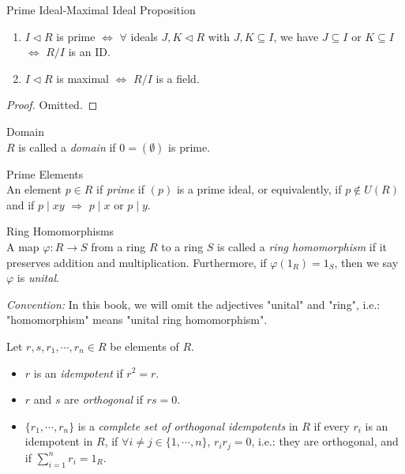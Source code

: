 \begin{proposition}{Prime Ideal-Maximal Ideal Proposition}
\begin{enumerate}
    \item $I \triangleleft R$ is prime $\Leftrightarrow$ $\forall$ ideals $J,K \triangleleft R$ with $J,K \subseteq I$, we have $J \subseteq I$ or $K \subseteq I$ $\Leftrightarrow$ $R/I$ is an ID.
    \item $I \triangleleft R$ is maximal $\Leftrightarrow$ $R/I$ is a field.
\end{enumerate}
\end{proposition}

\begin{proof}
    Omitted.
\end{proof}

\begin{definition}{Domain}\\
$R$ is called a \textit{domain} if $0= (\emptyset)$ is prime.
\end{definition}

\begin{definition}{Prime Elements}\\
An element $p \in R$ if \textit{prime} if $(p)$ is a prime ideal, or equivalently, if $p \notin U(R)$ and if $p \mid xy$ $\Rightarrow$ $p\mid x$ or $p\mid y$.
\end{definition}

\begin{definition}{Ring Homomorphisms}\\
A map $\varphi: R \to S$ from a ring $R$ to a ring $S$ is called a \textit{ring homomorphism} if it preserves addition and multiplication. Furthermore, if $\varphi(1_R)= 1_S$, then we say $\varphi$ is \textit{unital}.
\end{definition}

\noindent\textit{Convention:} In this book, we will omit the adjectives "unital" and "ring", i.e.: "homomorphism" means "unital ring homomorphism".

\begin{definition}
    Let $r,s,r_1,\cdots,r_n \in R$ be elements of $R$.
    \begin{itemize}
        \item $r$ is an \textit{idempotent} if $r^2=r$.
        \item $r$ and $s$ are \textit{orthogonal} if $rs=0$.
        \item $\{r_1,\cdots,r_n\}$ is a \textit{complete set of orthogonal idempotents} in $R$ if every $r_i$ is an idempotent in $R$, if $\forall i\neq j \in \{ 1,\cdots, n\}$, $r_ir_j =0$, i.e.: they are orthogonal, and if $\sum_{i=1}^n r_i=1_R$.
    \end{itemize}
\end{definition}

